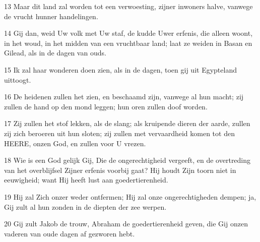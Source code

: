 \par 13 Maar dit land zal worden tot een verwoesting, zijner inwoners halve, vanwege de vrucht hunner handelingen.
\par 14 Gij dan, weid Uw volk met Uw staf, de kudde Uwer erfenis, die alleen woont, in het woud, in het midden van een vruchtbaar land; laat ze weiden in Basan en Gilead, als in de dagen van ouds.
\par 15 Ik zal haar wonderen doen zien, als in de dagen, toen gij uit Egypteland uittoogt.
\par 16 De heidenen zullen het zien, en beschaamd zijn, vanwege al hun macht; zij zullen de hand op den mond leggen; hun oren zullen doof worden.
\par 17 Zij zullen het stof lekken, als de slang; als kruipende dieren der aarde, zullen zij zich beroeren uit hun sloten; zij zullen met vervaardheid komen tot den HEERE, onzen God, en zullen voor U vrezen.
\par 18 Wie is een God gelijk Gij, Die de ongerechtigheid vergeeft, en de overtreding van het overblijfsel Zijner erfenis voorbij gaat? Hij houdt Zijn toorn niet in eeuwigheid; want Hij heeft lust aan goedertierenheid.
\par 19 Hij zal Zich onzer weder ontfermen; Hij zal onze ongerechtigheden dempen; ja, Gij zult al hun zonden in de diepten der zee werpen.
\par 20 Gij zult Jakob de trouw, Abraham de goedertierenheid geven, die Gij onzen vaderen van oude dagen af gezworen hebt.



